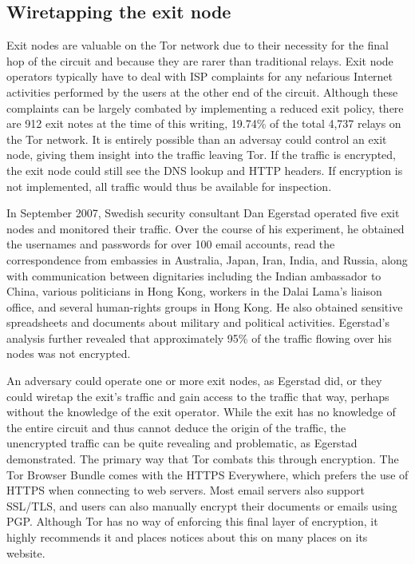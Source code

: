 \documentclass[journal]{IEEEtran}
\begin{document}
\subsection{Wiretapping the exit node}

Exit nodes are valuable on the Tor network due to their necessity for the final hop of the circuit and because they are rarer than traditional relays. Exit node operators typically have to deal with ISP complaints for any nefarious Internet activities performed by the users at the other end of the circuit. Although these complaints can be largely combated by implementing a reduced exit policy, there are 912 exit notes at the time of this writing, 19.74\% of the total 4,737 relays on the Tor network. It is entirely possible than an adversay could control an exit node, giving them insight into the traffic leaving Tor. If the traffic is encrypted, the exit node could still see the DNS lookup and HTTP headers. If encryption is not implemented, all traffic would thus be available for inspection.

In September 2007, Swedish security consultant Dan Egerstad operated five exit nodes and monitored their traffic. Over the course of his experiment, he obtained the usernames and passwords for over 100 email accounts, read the correspondence from embassies in Australia, Japan, Iran, India, and Russia, along with communication between dignitaries including the Indian ambassador to China, various politicians in Hong Kong, workers in the Dalai Lama's liaison office, and several human-rights groups in Hong Kong. He also obtained sensitive spreadsheets and documents about military and political activities. Egerstad's analysis further revealed that approximately 95\% of the traffic flowing over his nodes was not encrypted.\cite{Wired2007}

An adversary could operate one or more exit nodes, as Egerstad did, or they could wiretap the exit's traffic and gain access to the traffic that way, perhaps without the knowledge of the exit operator. While the exit has no knowledge of the entire circuit and thus cannot deduce the origin of the traffic, the unencrypted traffic can be quite revealing and problematic, as Egerstad demonstrated. The primary way that Tor combats this through encryption. The Tor Browser Bundle comes with the HTTPS Everywhere, which prefers the use of HTTPS when connecting to web servers. Most email servers also support SSL/TLS, and users can also manually encrypt their documents or emails using PGP. Although Tor has no way of enforcing this final layer of encryption, it highly recommends it and places notices about this on many places on its website.
\end{document}
